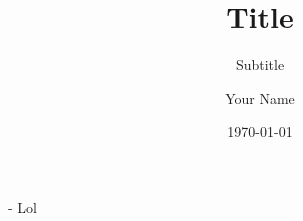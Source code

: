 \documentclass[final,12pt]{beamer}
\title[Short title]{Title}
\subtitle{Subtitle}
\author[Your Name]{Your Name}
\institute[AM FAU]{Applied Mathematics, FAU Erlangen--Nürnberg}
\date{\today}
\begin{document}
\begin{frame}[t]{-}{}
Lol
\end{frame}
\end{document}
